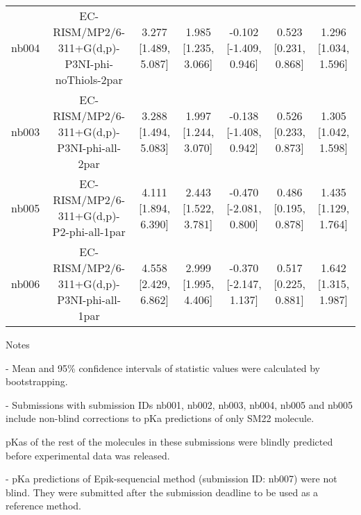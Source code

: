 \documentclass{article}
\begin{document}
\begin{center}
\begin{longtable}{|ccccccc|}
 nb004 &    EC-RISM/MP2/6-311+G(d,p)-P3NI-phi-noThiols-2par &  3.277 [1.489, 5.087] &  1.985 [1.235, 3.066] &   -0.102 [-1.409, 0.946] &  0.523 [0.231, 0.868] &   1.296 [1.034, 1.596] \\
 nb003 &         EC-RISM/MP2/6-311+G(d,p)-P3NI-phi-all-2par &  3.288 [1.494, 5.083] &  1.997 [1.244, 3.070] &   -0.138 [-1.408, 0.942] &  0.526 [0.233, 0.873] &   1.305 [1.042, 1.598] \\
 nb005 &           EC-RISM/MP2/6-311+G(d,p)-P2-phi-all-1par &  4.111 [1.894, 6.390] &  2.443 [1.522, 3.781] &   -0.470 [-2.081, 0.800] &  0.486 [0.195, 0.878] &   1.435 [1.129, 1.764] \\
 nb006 &         EC-RISM/MP2/6-311+G(d,p)-P3NI-phi-all-1par &  4.558 [2.429, 6.862] &  2.999 [1.995, 4.406] &   -0.370 [-2.147, 1.137] &  0.517 [0.225, 0.881] &   1.642 [1.315, 1.987] \\
\end{longtable}
\end{center}

Notes

- Mean and 95\% confidence intervals of statistic values were calculated by bootstrapping.

- Submissions with submission IDs nb001, nb002, nb003, nb004, nb005 and nb005 include non-blind corrections to pKa predictions of only SM22 molecule.

pKas of the rest of the molecules in these submissions were blindly predicted before experimental data was released.

- pKa predictions of Epik-sequencial method (submission ID: nb007) were not blind. They were submitted after the submission deadline to be used as a reference method.
\end{document}
